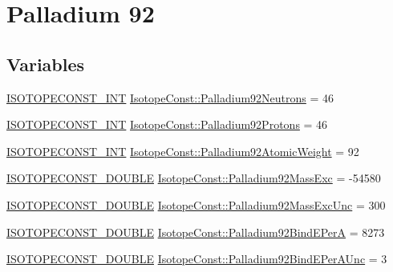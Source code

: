\hypertarget{group___isotope_const-_palladium-_pd92}{}\section{Palladium 92}
\label{group___isotope_const-_palladium-_pd92}
\subsection*{Variables}
\begin{DoxyCompactItemize}
\item 
\mbox{\hyperlink{group___isotope_const-_macros_ga5f18360b3e99483a35c32d789e62621c}{I\+S\+O\+T\+O\+P\+E\+C\+O\+N\+S\+T\+\_\+\+I\+NT}} \mbox{\hyperlink{group___isotope_const-_palladium-_pd92_gacc14bc4fcd8f27edeb5283d509352aa4}{Isotope\+Const\+::\+Palladium92\+Neutrons}} = 46
\item 
\mbox{\hyperlink{group___isotope_const-_macros_ga5f18360b3e99483a35c32d789e62621c}{I\+S\+O\+T\+O\+P\+E\+C\+O\+N\+S\+T\+\_\+\+I\+NT}} \mbox{\hyperlink{group___isotope_const-_palladium-_pd92_gad325ccdea2c770b90babcd8550d2e7a2}{Isotope\+Const\+::\+Palladium92\+Protons}} = 46
\item 
\mbox{\hyperlink{group___isotope_const-_macros_ga5f18360b3e99483a35c32d789e62621c}{I\+S\+O\+T\+O\+P\+E\+C\+O\+N\+S\+T\+\_\+\+I\+NT}} \mbox{\hyperlink{group___isotope_const-_palladium-_pd92_gad573249eb4b7f3bcf07c618aeec49b7a}{Isotope\+Const\+::\+Palladium92\+Atomic\+Weight}} = 92
\item 
\mbox{\hyperlink{group___isotope_const-_macros_ga8f45a7272ce02c0b4c65c44636ed719a}{I\+S\+O\+T\+O\+P\+E\+C\+O\+N\+S\+T\+\_\+\+D\+O\+U\+B\+LE}} \mbox{\hyperlink{group___isotope_const-_palladium-_pd92_ga0b8b53cf0592b2e39653dc59a17514ae}{Isotope\+Const\+::\+Palladium92\+Mass\+Exc}} = -\/54580
\item 
\mbox{\hyperlink{group___isotope_const-_macros_ga8f45a7272ce02c0b4c65c44636ed719a}{I\+S\+O\+T\+O\+P\+E\+C\+O\+N\+S\+T\+\_\+\+D\+O\+U\+B\+LE}} \mbox{\hyperlink{group___isotope_const-_palladium-_pd92_gab1cd22af1405cfc456ca9b467b003206}{Isotope\+Const\+::\+Palladium92\+Mass\+Exc\+Unc}} = 300
\item 
\mbox{\hyperlink{group___isotope_const-_macros_ga8f45a7272ce02c0b4c65c44636ed719a}{I\+S\+O\+T\+O\+P\+E\+C\+O\+N\+S\+T\+\_\+\+D\+O\+U\+B\+LE}} \mbox{\hyperlink{group___isotope_const-_palladium-_pd92_ga4546a56847bc3cc40f51bff6c60da1a9}{Isotope\+Const\+::\+Palladium92\+Bind\+E\+PerA}} = 8273
\item 
\mbox{\hyperlink{group___isotope_const-_macros_ga8f45a7272ce02c0b4c65c44636ed719a}{I\+S\+O\+T\+O\+P\+E\+C\+O\+N\+S\+T\+\_\+\+D\+O\+U\+B\+LE}} \mbox{\hyperlink{group___isotope_const-_palladium-_pd92_ga09e4afcbd3f72bc33212154136ceb006}{Isotope\+Const\+::\+Palladium92\+Bind\+E\+Per\+A\+Unc}} = 3

\end{DoxyCompactItemize}
